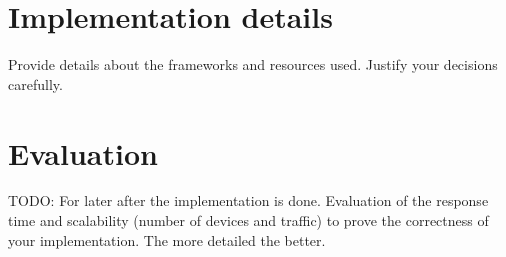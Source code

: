 \documentclass[conference]{IEEEtran}
\begin{document}
\section{Implementation details}
Provide details about the frameworks and resources used. Justify your decisions carefully.

\section{Evaluation}
TODO: For later after the implementation is done.
Evaluation of the response time and scalability (number of devices and traffic) to prove the correctness of your implementation. The more detailed the better. 
\end{document}
